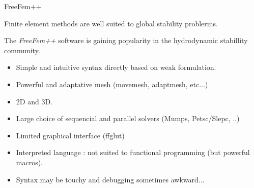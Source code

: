 \documentclass{beamer}
\begin{document}
\begin{frame}{FreeFem++}

Finite element methods are well suited to global stability problerms.

The {\em FreeFem++} software is gaining popularity in the hydrodynamic stabillity community.

\small

\begin{itemize}[<+->]
\item
{\color{green} \Smiley{} \quad } Simple and intuitive syntax directly based on weak formulation.
\item
{\color{green} \Smiley{} \quad } Powerful and adaptative mesh  (movemesh, adaptmesh, etc...)
\item
{\color{green} \Smiley{} \quad } 2D and 3D.
\item
{\color{green} \Smiley{} \quad } Large choice of sequencial and parallel solvers  (Mumps, Petsc/Slepc, ..)
\item
{\color{red} \Frowny{} \quad } Limited graphical interface (ffglut) %
\item
{\color{red} \Frowny{} \quad } Interpreted language : not suited to functional programming (but powerful macros).
\item
{\color{red} \Frowny{} \quad } Syntax may be touchy and debugging sometimes awkward...
\end{itemize}
\end{frame}
\end{document}
